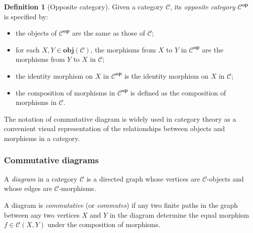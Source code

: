 \documentclass[12pt,twoside,a4paper]{report}
\theoremstyle{definition}
\newtheorem{definition}{Definition}
\theoremstyle{definition}
\theoremstyle{definition}
\theoremstyle{definition}
\begin{document}
            \begin{definition}[Opposite category]
                Given a category $\mathcal{C}$, its \emph{opposite category} $\mathcal{C}^{\textbf{op}}$ is specified by:
                \begin{itemize}
                    \item 
                        the objects of $\mathcal{C}^{\textbf{op}}$ are the same as those of $\mathcal{C}$;
                    \item 
                        for each $X, Y \in \textbf{obj}(\mathcal{C})$, the morphisms from $X$ to $Y$ in $\mathcal{C}^{\textbf{op}}$ are the morphisms from $Y$ to $X$ in $\mathcal{C}$;
                    \item 
                        the identity morphism on $X$ in $\mathcal{C}^{\textbf{op}}$ is the identity morphism on $X$ in $\mathcal{C}$;
                    \item 
                        the composition of morphisms in $\mathcal{C}^{\textbf{op}}$ is defined as the composition of morphisms in $\mathcal{C}$.
                \end{itemize}
            \end{definition}


            The notation of commutative diagram is widely used in category theory as a convenient visual representation of the relationships between objects and morphisms in a category.
            \subsubsection{Commutative diagrams}
            A \emph{diagram} in a category $\mathcal{C}$ is a directed graph whose vertices are $\mathcal{C}$-objects and whose edges are $\mathcal{C}$-morphisms.

            A diagram is \emph{commutative} (or \emph{commutes}) if any two finite paths in the graph between any two vertices $X$ and $Y$ in the diagram determine the equal morphism $f \in \mathcal{C}{(X,Y)}$ under the composition of morphisms.
\end{document}
